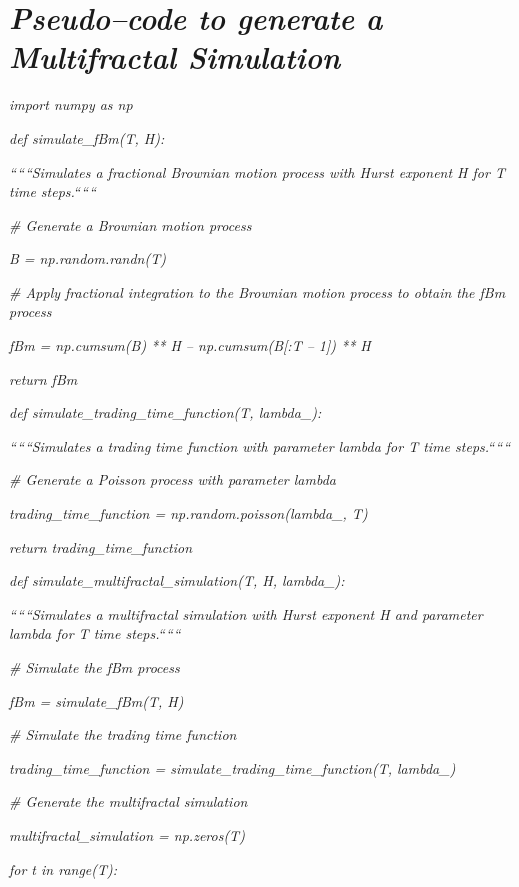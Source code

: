 \documentclass[12pt,a4paper]{report}
\numberwithin{equation}{section}
\begin{document}
\hypertarget{pseudo--code--to--generate--a--multifractal--simulation}{%
\section{\texorpdfstring{\emph{\textbf{Pseudo--code to generate a
Multifractal
Simulation}}}{Pseudo--code to generate a Multifractal Simulation}}\label{pseudo--code--to--generate--a--multifractal--simulation}}

\emph{import numpy as np}

\emph{def simulate\_fBm(T, H):}

\emph{``````Simulates a fractional Brownian motion process with Hurst
exponent H for T time steps.``````}

\emph{\# Generate a Brownian motion process}

\emph{B = np.random.randn(T)}

\emph{\# Apply fractional integration to the Brownian motion process to
obtain the fBm process}

\emph{fBm = np.cumsum(B) ** H -- np.cumsum(B{[}:T -- 1{]}) ** H}

\emph{return fBm}

\emph{def simulate\_trading\_time\_function(T, lambda\_):}

\emph{``````Simulates a trading time function with parameter lambda for T
time steps.``````}

\emph{\# Generate a Poisson process with parameter lambda}

\emph{trading\_time\_function = np.random.poisson(lambda\_, T)}

\emph{return trading\_time\_function}

\emph{def simulate\_multifractal\_simulation(T, H, lambda\_):}

\emph{``````Simulates a multifractal simulation with Hurst exponent H and
parameter lambda for T time steps.``````}

\emph{\# Simulate the fBm process}

\emph{fBm = simulate\_fBm(T, H)}

\emph{\# Simulate the trading time function}

\emph{trading\_time\_function = simulate\_trading\_time\_function(T,
lambda\_)}

\emph{\# Generate the multifractal simulation}

\emph{multifractal\_simulation = np.zeros(T)}

\emph{for t in range(T):}
\end{document}
